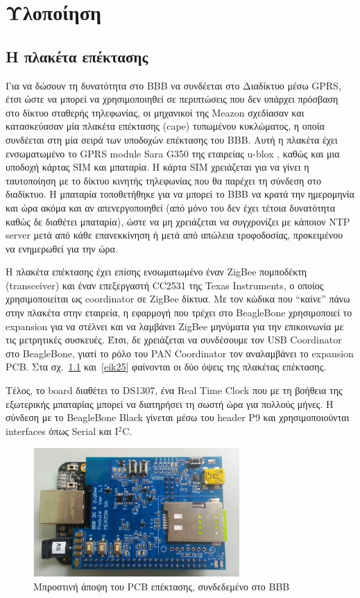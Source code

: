\documentclass[12pt, a4paper, oneside]{report}
\begin{document}
\chapter{Υλοποίηση}

\section{Η πλακέτα επέκτασης}

Για να δώσουν τη δυνατότητα στο BBB να συνδέεται στο Διαδίκτυο μέσω GPRS, έτσι ώστε να μπορεί να χρησιμοποιηθεί σε περιπτώσεις που δεν υπάρχει πρόσβαση στο δίκτυο σταθερής τηλεφωνίας, οι μηχανικοί της Meazon σχεδίασαν και κατασκεύασαν μία πλακέτα επέκτασης (cape) τυπωμένου κυκλώματος, η οποία συνδέεται στη μία σειρά των υποδοχών επέκτασης του BBB. Αυτή η πλακέτα έχει ενσωματωμένο το GPRS module Sara \mbox{G350} της εταιρείας u-blox \cite{sara}, καθώς και μια υποδοχή κάρτας SIM και μπαταρία. Η κάρτα SIM χρειάζεται για να γίνει η ταυτοποίηση με το δίκτυο κινητής τηλεφωνίας που θα παρέχει τη σύνδεση στο διαδίκτυο. Η μπαταρία τοποθετήθηκε για να μπορεί το BBB να κρατά την ημερομηνία και ώρα ακόμα και αν απενεργοποιηθεί (από μόνο του δεν έχει τέτοια δυνατότητα καθώς δε διαθέτει μπαταρία), ώστε να μη χρειάζεται να συγχρονίζει με κάποιον NTP server μετά από κάθε επανεκκίνηση ή μετά από απώλεια τροφοδοσίας, προκειμένου να ενημερωθεί για την ώρα.

Η πλακέτα επέκτασης έχει επίσης ενσωματωμένο έναν ZigBee πομποδέκτη (transceiver) και έναν επεξεργαστή CC2531 της \textenglish{Texas Instruments}, ο οποίος χρησιμοποιείται ως coordinator σε ZigBee δίκτυα. Με τον κώδικα που ``καίνε'' πάνω στην πλακέτα στην εταιρεία, η εφαρμογή που τρέχει στο BeagleBone χρησιμοποιεί το expansion για να στέλνει και να λαμβάνει ZigBee μηνύματα για την επικοινωνία με τις μετρητικές συσκευές. Έτσι, δε χρειάζεται να συνδέσουμε τον USB Coordinator στο BeagleBone, γιατί το ρόλο του PAN Coordinator τον αναλαμβάνει το expansion PCB. Στα σχ.~\ref{eik24} και~\ref{eik25} φαίνονται οι δύο όψεις της πλακέτας επέκτασης.

Τέλος, το board διαθέτει το DS1307, ένα Real Time Clock που με τη βοήθεια της εξωτερικής μπαταρίας μπορεί να διατηρήσει τη σωστή ώρα για πολλούς μήνες. Η σύνδεση με το BeagleBone Black γίνεται μέσω του header P9 και χρησιμοποιούνται interfaces όπως Serial και I$^2$C.

\begin{figure}[!hb]
\centering
\includegraphics[width=0.7\textwidth]{eikona_24}
\caption{Μπροστινή άποψη του PCB επέκτασης, συνδεδεμένο στο BBB}\label{eik24}
\end{figure}
\end{document}

